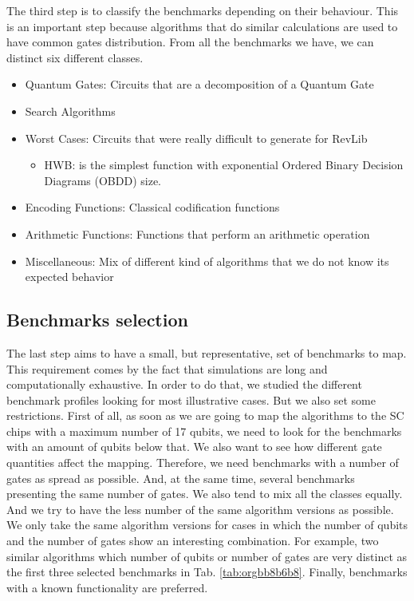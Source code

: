 \documentclass{book}
\begin{document}
The third step is to classify the benchmarks depending on their behaviour.
This is an important step because algorithms that do similar calculations are used to have common gates distribution.
From all the benchmarks we have, we can distinct six different classes.

\begin{itemize}
\item Quantum Gates: Circuits that are a decomposition of a Quantum Gate
\item Search Algorithms
\item Worst Cases: Circuits that were really difficult to generate for RevLib
\begin{itemize}
\item HWB: is the simplest function with exponential Ordered Binary Decision Diagrams (OBDD) size.
\end{itemize}
\item Encoding Functions: Classical codification functions
\item Arithmetic Functions: Functions that perform an arithmetic operation
\item Miscellaneous: Mix of different kind of algorithms that we do not know its expected behavior
\end{itemize}


\subsection*{Benchmarks selection}
\label{sec:org0688854}

The last step aims to have a small, but representative, set of benchmarks to map.
This requirement comes by the fact that simulations are long and computationally exhaustive.
In order to do that, we studied the different benchmark profiles looking for most illustrative cases.
But we also set some restrictions.
First of all, as soon as we are going to map the algorithms to the SC chips with a maximum number of 17 qubits, we need to look for the benchmarks with an amount of qubits below that.
We also want to see how different gate quantities affect the mapping.
Therefore, we need benchmarks with a number of gates as spread as possible.
And, at the same time, several benchmarks presenting the same number of gates.
We also tend to mix all the classes equally.
And we try to have the less number of the same algorithm versions as possible.
We only take the same algorithm versions for cases in which the number of qubits and the number of gates show an interesting combination.
For example, two similar algorithms which number of qubits or number of gates are very distinct as the first three selected benchmarks in Tab. \ref{tab:orgbb8b6b8}.
Finally, benchmarks with a known functionality are preferred.
\end{document}
